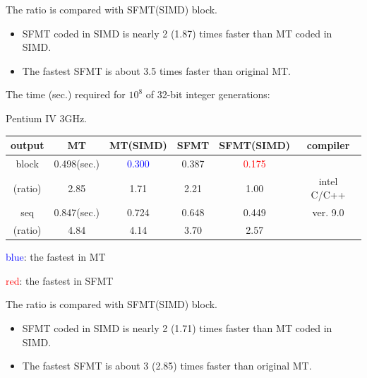 \documentclass[a4j,12pt,landscape]{jarticle}
\begin{document}
The ratio is compared with SFMT(SIMD) block.
\begin{itemize}
  \item SFMT coded in SIMD is nearly 2 (1.87) times faster than MT
 coded in SIMD.
  \item The fastest SFMT is about 3.5 times faster than original MT.
\end{itemize}
\newpage
\begin{center}
The time (sec.) required for $10^8$ 
of 32-bit integer generations:

Pentium IV 3GHz. 

\vskip 2mm
\begin{tabular}{|c||c|c|c|c|c|}
\hline
output & MT & MT{\Large(SIMD)} & SFMT & SFMT{\Large (SIMD)} & compiler
\\ \hline \hline
 block & 0.498(sec.) & \textcolor{blue}{0.300}
 & 0.387 & \textcolor{red}{0.175} & \\ \cline{2-5}
(ratio)& 2.85\phantom{0} & 1.71\phantom{0}  & 2.21\phantom{0}
  & 1.00\phantom{0}  & intel C/C++\\ \cline{1-5}
 seq   & 0.847(sec.) & 0.724 & 0.648 & 0.449 & ver. 9.0 \\\cline{2-5}
(ratio)& 4.84\phantom{0} & 4.14\phantom{0}  & 3.70\phantom{0}
  & 2.57\phantom{0}  &  \\ \hline
\end{tabular}
\end{center}
\textcolor{blue}{blue}: the fastest in MT

\textcolor{red}{red}: the fastest in SFMT

The ratio is compared with SFMT(SIMD) block.
\begin{itemize}
  \item SFMT coded in SIMD is nearly 2 (1.71) times faster than MT
 coded in SIMD.
  \item The fastest SFMT is about 3 (2.85) times faster than original MT.
\end{itemize}
\end{document}
